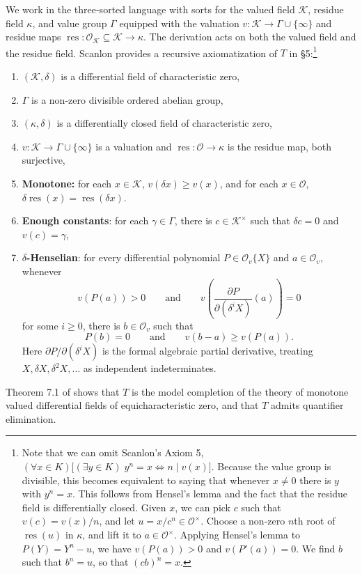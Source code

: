 \documentclass[12pt]{amsart}
\theoremstyle{definition}
\numberwithin{subcase}{cases}
\theoremstyle{remark}
\DeclareMathOperator{\res}{res}
\newcommand{\mc}[1]{\mathcal{#1}}
\begin{document}
We work in the three-sorted language with sorts for the valued field $\mc{K}$, residue field $\kappa$, and value group $\Gamma$ equipped with the valuation $v : \mc{K} \to \Gamma\cup \{\infty\}$ and residue maps $\res : \mc{O}_{\mc{K}} \subseteq \mc{K} \to \kappa$. The derivation acts on both the valued field and the residue field. Scanlon \cite{Scanlon00} provides a recursive axiomatization of $T$ in \S 5:\footnote{Note that we can omit Scanlon's Axiom 5, $(\forall x \in K)\bigl[(\exists y \in K)\; y^n = x
\iff n \mid v(x)\bigr]$. Because the value group is divisible, this becomes equivalent to saying that whenever $x \neq 0$ there is $y$ with $y^n = x$. This follows from Hensel's lemma and the fact that the residue field is differentially closed. Given $x$, we can pick $c$ such that $v(c) = v(x) / n$, and let $u = x / c^n \in \mc{O}^\times$. Choose a non-zero $n$th root of $\res(u)$ in $\kappa$, and lift it to $a \in \mc{O}^\times$. Applying Hensel's lemma to $P(Y) = Y^n - u$, we have $v(P(a)) > 0$ and $v(P'(a)) = 0$. We find $b$ such that $b^n = u$, so that $(cb)^n = x$.}
\begin{enumerate}
    \item $(\mc{K},\delta)$ is a differential field of characteristic zero,
    \item $\Gamma$ is a non-zero divisible ordered abelian group,
    \item $(\kappa,\delta)$ is a differentially closed field of characteristic zero,
    \item $v : \mc{K} \to \Gamma \cup \{\infty\}$ is a valuation and $\res : \mc{O} \to \kappa$ is the residue map, both surjective,
    \item \textbf{Monotone:} for each $x \in \mc{K}$, $v(\delta x) \geq v(x)$, and for each $x \in \mc{O}$, $\delta \res(x) = \res(\delta x)$.
    \item \textbf{Enough constants}: for each $\gamma \in \Gamma$, there is $c \in \mc{K}^\times$ such that $\delta c = 0$ and $v(c) = \gamma$,
    \item \textbf{$\delta$-Henselian}: for every differential polynomial $P \in \mathcal O_v\{X\}$ and $a \in \mathcal O_v$,
whenever
\[
v(P(a))>0
\qquad\text{and}\qquad
v\!\left(
  \frac{\partial P}{\partial(\delta^i X)}(a)
\right)=0
\]
for some $i\geq 0$, there is $b\in\mathcal O_v$ such that
\[
P(b)=0
\qquad\text{and}\qquad
v(b-a)\geq v(P(a)).
\]
Here $\partial P/\partial(\delta^i X)$ is the formal
algebraic partial derivative, treating $X,\delta X,\delta^2 X,\ldots$
as independent indeterminates.
\end{enumerate}
Theorem 7.1 of \cite{Scanlon00} shows that $T$ is the model completion of the theory of  monotone valued differential fields of equicharacteristic zero, and that $T$ admits quantifier elimination. %
\end{document}
